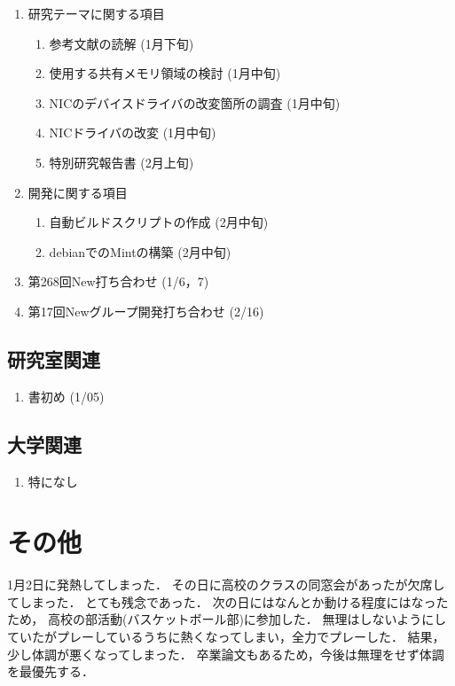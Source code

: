 \documentclass[fleqn, 14pt]{extarticle}
\begin{document}
\begin{enumerate}
\item 研究テーマに関する項目
\hfill
\begin{enumerate}


\item 参考文献の読解
\hfill
(1月下旬)

\item 使用する共有メモリ領域の検討
\hfill
(1月中旬)

\item NICのデバイスドライバの改変箇所の調査
\hfill
(1月中旬)

\item NICドライバの改変
\hfill
(1月中旬)

\item 特別研究報告書 
\hfill
(2月上旬)


\end{enumerate}
\item 開発に関する項目
\hfill
\begin{enumerate}

\item 自動ビルドスクリプトの作成
\hfill
(2月中旬)

\item debianでのMintの構築
\hfill
(2月中旬)

\end{enumerate}
\item 第268回New打ち合わせ
\hfill
\label{enum-7}
(1/6，7)
\item 第17回Newグループ開発打ち合わせ
\hfill
\label{enum-8}
(2/16)
\end{enumerate}

\subsection{研究室関連}
\label{sec-4-2}

\begin{enumerate}


\item 書初め 
\hfill
\label{enum-16}
(1/05)

\end{enumerate}

\subsection{大学関連}
\begin{enumerate}
\item 特になし
\end{enumerate}

\section{その他}
1月2日に発熱してしまった．
その日に高校のクラスの同窓会があったが欠席してしまった．
とても残念であった．
次の日にはなんとか動ける程度にはなったため，
高校の部活動(バスケットボール部)に参加した．
無理はしないようにしていたがプレーしているうちに熱くなってしまい，全力でプレーした．
結果，少し体調が悪くなってしまった．
卒業論文もあるため，今後は無理をせず体調を最優先する．
\end{document}
